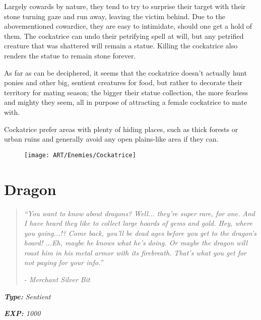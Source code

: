 \documentclass[11pt,a4paper,twocolumn]{book}
\begin{document}
	Largely cowards by nature, they tend to try to surprise their target with their stone turning gaze and run away, leaving the victim behind. Due to the abovementioned cowardice, they are easy to intimidate, should one get a hold of them. The cockatrice can undo their petrifying spell at will, but any petrified creature that was shattered will remain a statue. Killing the cockatrice also renders the statue to remain stone forever.
	
	\bigskip
	As far as can be deciphered, it seems that the cockatrice doesn't actually hunt ponies and other big, sentient creatures for food, but rather to decorate their territory for mating season; the bigger their statue collection, the more fearless and mighty they seem, all in purpose of attracting a female cockatrice to mate with.
	
	Cockatrice prefer areas with plenty of hiding places, such as thick forests or urban ruins and generally avoid any open plains-like area if they can.
	
	\begin{figure}[h]
		\centering
		\texttt{[image: ART/Enemies/Cockatrice]}
	\end{figure}
	
	
	\clearpage
	
	\section*{Dragon}
	\begin{quote}
		\emph{``You want to know about dragons? Well... they're super rare, for one. And I have heard they like to collect large hoards of gems and gold. Hey, where you going...!? Come back, you'll be dead ages before you get to the dragon's hoard! ...Eh, maybe he knows what he's doing. Or maybe the dragon will roast him in his metal armor with its firebreath. That's what you get for not paying for your info.''}
		
		\emph{-	Merchant Silver Bit}
	\end{quote}
	
	\noindent
	\emph{\textbf{Type:} Sentient}
	
	\noindent
	\emph{\textbf{EXP:} 1000}
	
\end{document}
